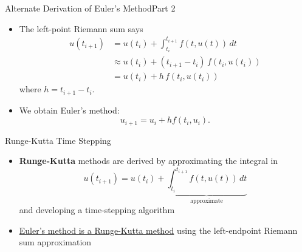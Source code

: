 \documentclass[10pt]{beamer}
\begin{document}
\begin{frame}{Alternate Derivation of Euler's Method}{Part 2}
\begin{itemize}
    \item The left-point Riemann sum says
        \begin{align*}
            u(t_{i+1}) &= u(t_i)+ \int_{t_i}^{t_{i+1}} f(t, u(t)) \, dt\\
                      &\approx u(t_i) + (t_{i+1}-t_i)\, f(t_i, u(t_i))\\ 
                      &= u(t_i) + h\,f(t_i, u(t_i)) 
        \end{align*}
        where \(h = t_{i+1} - t_i\).

    \item We obtain Euler’s method:
    \[
    u_{i+1} = u_i + h f(t_i, u_i).
    \]
\end{itemize}
\end{frame}


\begin{frame}{Runge-Kutta Time Stepping}
    \begin{itemize}
        \item \textbf{Runge-Kutta} methods are derived by approximating the integral in 
            $$
            u(t_{i+1}) = u(t_i) + \underbrace{\int_{t_i}^{t_{i+1}} f(t, u(t)) \, dt}_{\text{approximate}}
            $$
        and developing a time-stepping algorithm\\[3mm]

        \item \underline{Euler's method is a Runge-Kutta method} using the left-endpoint Riemann sum approximation
    \end{itemize}
\end{frame}

\end{document}
